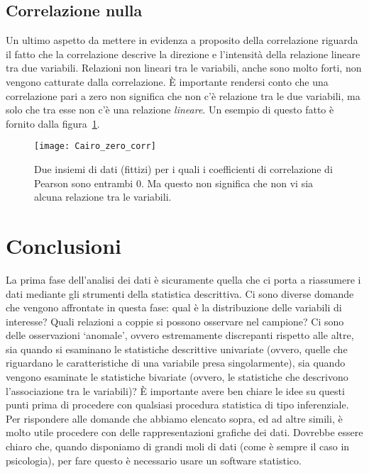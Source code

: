 \subsection{Correlazione nulla}

Un ultimo aspetto da mettere in evidenza a proposito della correlazione riguarda il fatto che la correlazione descrive la direzione e l'intensità della relazione lineare tra due variabili.
Relazioni non lineari tra le variabili, anche sono molto forti, non vengono catturate dalla correlazione.
È importante rendersi conto che una correlazione pari a zero non significa che non c'è relazione tra le due variabili, ma solo che tra esse non c'è una relazione \emph{lineare}.
Un esempio di questo fatto è fornito dalla figura~\ref{fig:Cairo_zero_corr}.

\begin{figure}[h!]
 \centering
 \texttt{[image: Cairo\_zero\_corr]}
 \caption{Due insiemi di dati (fittizi) per i quali i coefficienti di correlazione di Pearson sono entrambi 0. Ma questo non significa che non vi sia alcuna relazione tra le variabili.}
 \label{fig:Cairo_zero_corr}
 \end{figure}


\section*{Conclusioni}

La prima fase dell'analisi dei dati è sicuramente quella che ci porta a riassumere i dati mediante gli strumenti della statistica descrittiva.
Ci sono diverse domande che vengono affrontate in questa fase: qual è la distribuzione delle variabili di interesse? 
Quali relazioni a coppie si possono osservare nel campione?
Ci sono delle osservazioni `anomale', ovvero estremamente discrepanti rispetto alle altre, sia quando si esaminano le statistiche descrittive univariate (ovvero, quelle che riguardano le caratteristiche di una variabile presa singolarmente), sia quando vengono esaminate le statistiche bivariate (ovvero, le statistiche che descrivono l'associazione tra le variabili)?
È importante avere ben chiare le idee su questi punti prima di procedere con qualsiasi procedura statistica di tipo inferenziale.
Per rispondere alle domande che abbiamo elencato sopra, ed ad altre simili, è molto utile procedere con delle rappresentazioni grafiche dei dati.
Dovrebbe essere chiaro che, quando disponiamo di grandi moli di dati (come è sempre il caso in psicologia), per fare questo è necessario usare un software statistico.


